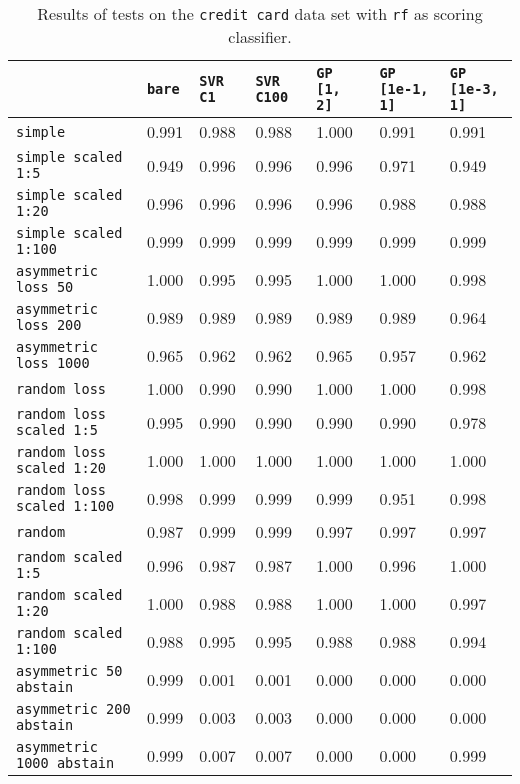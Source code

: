\begin{table}
{\scriptsize
\begin{tabu}{l|l|l|l|l|l|l}
&\texttt{bare} &\texttt{SVR C1} &\texttt{SVR C100} &\texttt{GP [1, 2]} &\texttt{GP [1e-1, 1]} &\texttt{GP [1e-3, 1]}  \\
\hline
\texttt{simple} &0.991 &0.988 &0.988 &1.000 &0.991 &0.991 \\
\texttt{simple scaled 1:5} &0.949 &0.996 &0.996 &0.996 &0.971 &0.949 \\
\texttt{simple scaled 1:20} &0.996 &0.996 &0.996 &0.996 &0.988 &0.988 \\
\texttt{simple scaled 1:100} &0.999 &0.999 &0.999 &0.999 &0.999 &0.999 \\
\texttt{asymmetric loss 50} &1.000 &0.995 &0.995 &1.000 &1.000 &0.998 \\
\texttt{asymmetric loss 200} &0.989 &0.989 &0.989 &0.989 &0.989 &0.964 \\
\texttt{asymmetric loss 1000} &0.965 &0.962 &0.962 &0.965 &0.957 &0.962 \\
\texttt{random loss} &1.000 &0.990 &0.990 &1.000 &1.000 &0.998 \\
\texttt{random loss scaled 1:5} &0.995 &0.990 &0.990 &0.990 &0.990 &0.978 \\
\texttt{random loss scaled 1:20} &1.000 &1.000 &1.000 &1.000 &1.000 &1.000 \\
\texttt{random loss scaled 1:100} &0.998 &0.999 &0.999 &0.999 &0.951 &0.998 \\
\texttt{random} &0.987 &0.999 &0.999 &0.997 &0.997 &0.997 \\
\texttt{random scaled 1:5} &0.996 &0.987 &0.987 &1.000 &0.996 &1.000 \\
\texttt{random scaled 1:20} &1.000 &0.988 &0.988 &1.000 &1.000 &0.997 \\
\texttt{random scaled 1:100} &0.988 &0.995 &0.995 &0.988 &0.988 &0.994 \\
\texttt{asymmetric 50 abstain} &0.999 &0.001 &0.001 &0.000 &0.000 &0.000 \\
\texttt{asymmetric 200 abstain} &0.999 &0.003 &0.003 &0.000 &0.000 &0.000 \\
\texttt{asymmetric 1000 abstain} &0.999 &0.007 &0.007 &0.000 &0.000 &0.999 \\
\end{tabu} }
\caption{Results of tests on the \texttt{credit card} data set
         with \texttt{rf} as scoring classifier.}
\end{table}

